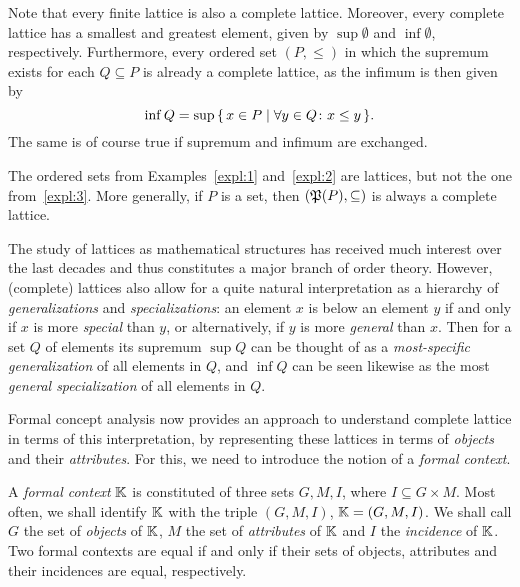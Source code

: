 Note that every finite lattice is also a complete lattice.  Moreover, every complete
lattice has a smallest and greatest element, given by $\sup\emptyset$ and $\inf\emptyset$,
respectively.  Furthermore, every ordered set $(P, \le)$ in which the supremum exists for
each $Q \subseteq P$ is already a complete lattice, as the infimum is then given by
\begin{equation*}
  \inf Q = \sup{\ensuremath{\{\, x \in P \mid \forall y \in Q \colon x \le y \,\}}}.
\end{equation*}
The same is of course true if supremum and infimum are exchanged.

The ordered sets from Examples~\ref{expl:1} and~\ref{expl:2} are lattices, but not the one
from~\ref{expl:3}.  More generally, if $P$ is a set, then $({\mathfrak{P}(P)}, \subseteq)$ is
always a complete lattice.

The study of lattices as mathematical structures has received much interest over the last
decades and thus constitutes a major branch of order theory. However, (complete) lattices also allow for a quite natural
interpretation as a hierarchy of \emph{generalizations} and \emph{specializations}: an
element $x$ is below an element $y$ if and only if $x$ is more \emph{special} than $y$, or
alternatively, if $y$ is more \emph{general} than $x$.  Then for a set $Q$ of elements its
supremum $\sup Q$ can be thought of as a \emph{most-specific generalization} of all
elements in $Q$, and $\inf Q$ can be seen likewise as the most \emph{general
  specialization} of all elements in $Q$.

Formal concept analysis now provides an approach to understand complete lattice in terms
of this interpretation, by representing these lattices in terms of \emph{objects} and
their \emph{attributes}.  For this, we need to introduce the notion of a \emph{formal
  context}.

\begin{Definition}
  \label{def:formal-context}
  A \emph{formal context} ${\mathbb{K}}$ is constituted of three sets $G, M, I$, where $I
  \subseteq G \times M$.  Most often, we shall identify ${\mathbb{K}}$ with the triple $(G, M,
  I)$, \ie ${\mathbb{K}} = (G, M, I)$.  We shall call $G$ the set of \emph{objects} of ${\mathbb{K}}$,
  $M$ the set of \emph{attributes} of ${\mathbb{K}}$ and $I$ the \emph{incidence} of ${\mathbb{K}}$.
  Two formal contexts are equal if and only if their sets of objects, attributes and their
  incidences are equal, respectively.
\end{Definition}


